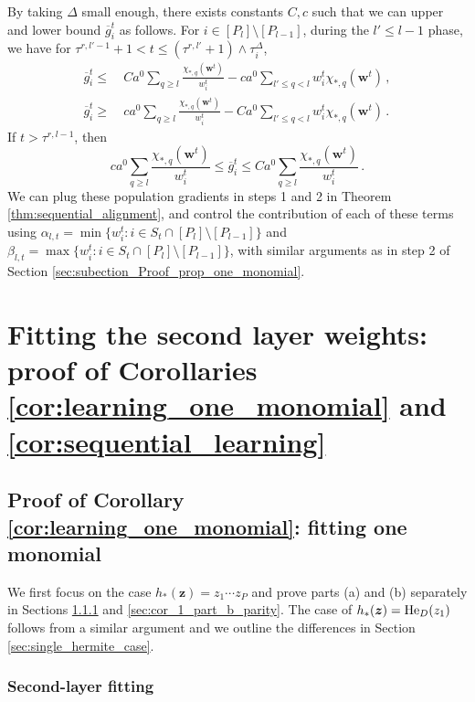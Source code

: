 \documentclass[11pt]{article}
\newcommand{\<}{\langle}
\renewcommand{\>}{\rangle}
\theoremstyle{definition}
\def\bw{{\boldsymbol w}}
\def\bz{{\boldsymbol z}}
\def\bz{{\boldsymbol z}}
\def\He{{\rm He}}
\def\bw{{\boldsymbol w}}
\def\bz{{\boldsymbol z}}
\def\He{{\rm He}}
\def\og{\overline{g}}
\begin{document}
By taking $\Delta$ small enough, there exists constants $C,c$ such that we can upper and lower bound $\og_i^t$ as follows. For $i \in [P_l] \setminus [P_{l-1}] $, during the $l' \leq l- 1$ phase, we have for $\tau^{r,l' - 1} + 1 <t \leq ( \tau^{r,l'}+1) \wedge \tau_i^\Delta$,
\[
\begin{aligned}
\og_i^t \leq&~ C a^0 \sum_{q \geq l} \frac{\chi_{*,q} (\bw^t)}{w_i^t} - ca^0 \sum_{l' \leq q < l} w_i^t \chi_{*,q} (\bw^t)\, , \\
\og_i^t \geq&~ c a^0 \sum_{q \geq l} \frac{\chi_{*,q} (\bw^t)}{w_i^t} - Ca^0 \sum_{l' \leq q < l} w_i^t \chi_{*,q} (\bw^t)\, .
\end{aligned}
\]
If $t > \tau^{r,l-1}$, then 
\[
c a^0 \sum_{q \geq l} \frac{\chi_{*,q} (\bw^t)}{w_i^t} \leq \og_i^t \leq C a^0 \sum_{q \geq l} \frac{\chi_{*,q} (\bw^t)}{w_i^t} \, .
\]
We can plug these population gradients in steps 1 and 2 in Theorem \ref{thm:sequential_alignment}, and control the contribution of each of these terms using $\alpha_{l,t} = \min \{ w_i^t : i \in S_t \cap [P_l] \setminus [P_{l-1}] \}$ and $\beta_{l,t} = \max \{ w_i^t : i \in S_t \cap [P_l] \setminus [P_{l-1}] \}$, with similar arguments as in step 2 of Section \ref{sec:subection_Proof_prop_one_monomial}.


\clearpage

\section{Fitting the second layer weights: proof of Corollaries \ref{cor:learning_one_monomial} and \ref{cor:sequential_learning}}

\subsection{Proof of Corollary \ref{cor:learning_one_monomial}: fitting one monomial}\label{app:second_layer_monomial}

We first focus on the case $h_* (\bz) = z_1 \cdots z_P$ and prove parts (a) and (b) separately in Sections \ref{sec:cor_1_part_a_parity} and \ref{sec:cor_1_part_b_parity}. The case of $h_* (\bz) = \He_D (z_1)$ follows from a similar argument and we outline the differences in Section \ref{sec:single_hermite_case}.

\subsubsection{Second-layer fitting}
\label{sec:cor_1_part_a_parity}
\end{document}
